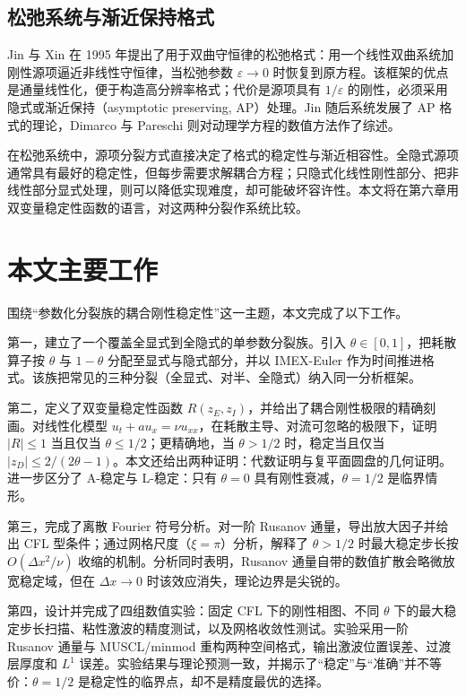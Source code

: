 \subsection{松弛系统与渐近保持格式}

Jin 与 Xin 在 1995 年提出了用于双曲守恒律的松弛格式\cite{jinxin1995}：用一个线性双曲系统加刚性源项逼近非线性守恒律，当松弛参数 $\varepsilon\to0$ 时恢复到原方程。该框架的优点是通量线性化，便于构造高分辨率格式；代价是源项具有 $1/\varepsilon$ 的刚性，必须采用隐式或渐近保持（asymptotic preserving, AP）处理。Jin 随后系统发展了 AP 格式的理论\cite{jin1999}，Dimarco 与 Pareschi 则对动理学方程的数值方法作了综述\cite{dimarco2014}。

在松弛系统中，源项分裂方式直接决定了格式的稳定性与渐近相容性。全隐式源项通常具有最好的稳定性，但每步需要求解耦合方程；只隐式化线性刚性部分、把非线性部分显式处理，则可以降低实现难度，却可能破坏容许性。本文将在第六章用双变量稳定性函数的语言，对这两种分裂作系统比较。

\section{本文主要工作}

围绕“参数化分裂族的耦合刚性稳定性”这一主题，本文完成了以下工作。

第一，建立了一个覆盖全显式到全隐式的单参数分裂族。引入 $\theta\in[0,1]$，把耗散算子按 $\theta$ 与 $1-\theta$ 分配至显式与隐式部分，并以 IMEX-Euler 作为时间推进格式。该族把常见的三种分裂（全显式、对半、全隐式）纳入同一分析框架。

第二，定义了双变量稳定性函数 $R(z_E,z_I)$，并给出了耦合刚性极限的精确刻画。对线性化模型 $u_t+au_x=\nu u_{xx}$，在耗散主导、对流可忽略的极限下，证明 $|R|\le1$ 当且仅当 $\theta\le1/2$；更精确地，当 $\theta>1/2$ 时，稳定当且仅当 $|z_D|\le2/(2\theta-1)$。本文还给出两种证明：代数证明与复平面圆盘的几何证明。进一步区分了 A-稳定与 L-稳定：只有 $\theta=0$ 具有刚性衰减，$\theta=1/2$ 是临界情形。

第三，完成了离散 Fourier 符号分析。对一阶 Rusanov 通量，导出放大因子并给出 CFL 型条件；通过网格尺度（$\xi=\pi$）分析，解释了 $\theta>1/2$ 时最大稳定步长按 $O(\Delta x^2/\nu)$ 收缩的机制。分析同时表明，Rusanov 通量自带的数值扩散会略微放宽稳定域，但在 $\Delta x\to0$ 时该效应消失，理论边界是尖锐的。

第四，设计并完成了四组数值实验：固定 CFL 下的刚性相图、不同 $\theta$ 下的最大稳定步长扫描、粘性激波的精度测试，以及网格收敛性测试。实验采用一阶 Rusanov 通量与 MUSCL/minmod 重构两种空间格式，输出激波位置误差、过渡层厚度和 $L^1$ 误差。实验结果与理论预测一致，并揭示了“稳定”与“准确”并不等价：$\theta=1/2$ 是稳定性的临界点，却不是精度最优的选择。

